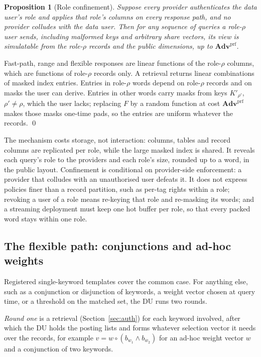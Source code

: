 \documentclass[a4paper,fleqn]{cas-sc}
\newtheorem{proposition}{Proposition}
\newcommand{\advPRF}{\mathbf{Adv}^{\mathrm{prf}}}
\begin{document}
\begin{proposition}[Role confinement]
\label{prop:role}
Suppose every provider authenticates the data user's role and applies that
role's columns on every response path, and no provider colludes with the data
user. Then for any sequence of queries a role-$\rho$ user sends,
including malformed keys and arbitrary share vectors, its view is simulatable
from the role-$\rho$ records and the public dimensions, up to
$\advPRF$.
\end{proposition}
\begin{pf}
Fast-path, range and flexible responses are linear functions of the
role-$\rho$ columns, which are functions of role-$\rho$ records only. A
retrieval returns linear combinations of masked index entries. Entries in
role-$\rho$ words depend on role-$\rho$ records and on masks the user can
derive. Entries in other words carry masks from keys $K'_{\rho'}$,
$\rho'\neq\rho$, which the user lacks; replacing $F$ by a random function at
cost $\advPRF$ makes those masks one-time pads, so the entries are uniform
whatever the records. \qed
\end{pf}

The mechanism costs storage, not interaction: columns, tables and record
columns are replicated per role, while the large masked index is shared. It
reveals each query's role to the providers and each role's size, rounded up to
a word, in the public layout. Confinement is conditional on provider-side
enforcement: a provider that colludes with an unauthorised user defeats it. It
does not express policies finer than a record
partition, such as per-tag rights within a role; revoking a user of a role
means re-keying that role and re-masking its words; and a streaming deployment
must keep one hot buffer per role, so that every packed word stays within one
role.

\subsection{The flexible path: conjunctions and ad-hoc weights}
\label{sec:flex}
Registered single-keyword templates cover the common case. For anything else,
such as a conjunction or disjunction of keywords, a weight vector chosen at
query time, or a threshold on the matched set, the DU runs two rounds.

\emph{Round one} is a retrieval (Section~\ref{sec:auth}) for each keyword
involved, after which the DU holds the posting lists and forms whatever
selection vector it needs over the records, for example
$v=w\circ(b_{w_1}\wedge b_{w_2})$ for an ad-hoc weight vector $w$ and a
conjunction of two keywords.
\end{document}
